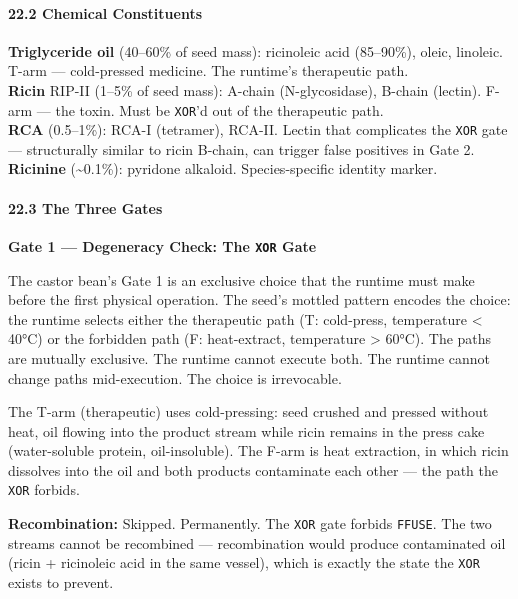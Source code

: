 \hypertarget{chemical-constituents-2}{%
\paragraph{22.2 Chemical Constituents}\label{chemical-constituents-2}}

\textbf{Triglyceride oil} (40--60\% of seed mass): ricinoleic acid
(85--90\%), oleic, linoleic. T-arm --- cold-pressed medicine. The
runtime's therapeutic path.\\
\textbf{Ricin} RIP-II (1--5\% of seed mass): A-chain (N-glycosidase),
B-chain (lectin). F-arm --- the toxin. Must be \texttt{XOR}'d out of the
therapeutic path.\\
\textbf{RCA} (0.5--1\%): RCA-I (tetramer), RCA-II. Lectin that
complicates the \texttt{XOR} gate --- structurally similar to ricin
B-chain, can trigger false positives in Gate 2.\\
\textbf{Ricinine} (\textasciitilde0.1\%): pyridone alkaloid.
Species-specific identity marker.

\hypertarget{the-three-gates-2}{%
\paragraph{22.3 The Three Gates}\label{the-three-gates-2}}

\textbf{Gate 1 --- Degeneracy Check: The \texttt{XOR} Gate}

The castor bean's Gate 1 is an exclusive choice that the runtime must
make before the first physical operation. The seed's mottled pattern
encodes the choice: the runtime selects either the therapeutic path (T:
cold-press, temperature \textless{} 40°C) or the forbidden path (F:
heat-extract, temperature \textgreater{} 60°C). The paths are mutually
exclusive. The runtime cannot execute both. The runtime cannot change
paths mid-execution. The choice is irrevocable.

The T-arm (therapeutic) uses cold-pressing: seed crushed and pressed
without heat, oil flowing into the product stream while ricin remains in
the press cake (water-soluble protein, oil-insoluble). The F-arm is heat
extraction, in which ricin dissolves into the oil and both products
contaminate each other --- the path the \texttt{XOR} forbids.

\textbf{Recombination:} Skipped. Permanently. The \texttt{XOR} gate
forbids \texttt{FFUSE}. The two streams cannot be recombined ---
recombination would produce contaminated oil (ricin + ricinoleic acid in
the same vessel), which is exactly the state the \texttt{XOR} exists to
prevent.

